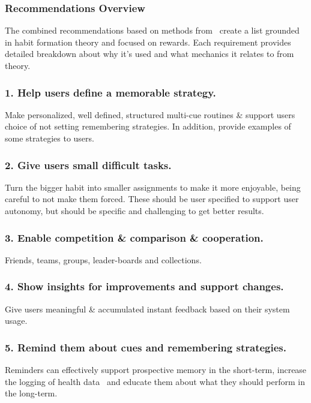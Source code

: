\subsubsection*{Recommendations Overview}

The combined recommendations based on methods from~\cite{thesis_kathy, article_taxonomy_motivational_affordances_meaningful} create a list grounded in habit formation theory and focused on rewards. Each requirement provides detailed breakdown about why it's used and what mechanics it relates to from theory.


\subsubsection*{1. Help users define a memorable strategy.}
Make personalized, well defined, structured multi-cue routines \& support users choice of not setting remembering strategies. In addition, provide examples of some strategies to users.

\subsubsection*{2. Give users small difficult tasks.}
Turn the bigger habit into smaller assignments to make it more enjoyable, being careful to not make them forced. These should be user specified to support user autonomy, but should be specific and challenging to get better results.

\subsubsection*{3. Enable competition \& comparison \& cooperation.}
Friends, teams, groups, leader-boards and collections.

\subsubsection*{4. Show insights for improvements and support changes.}
Give users meaningful \& accumulated  instant feedback based on their system usage.

\subsubsection*{5. Remind them about cues and remembering strategies.}
Reminders can effectively support prospective memory in the short-term, increase the logging of health data~\cite{the_power_of_logging_mobile_notifications} and educate them about what they should perform in the long-term.

